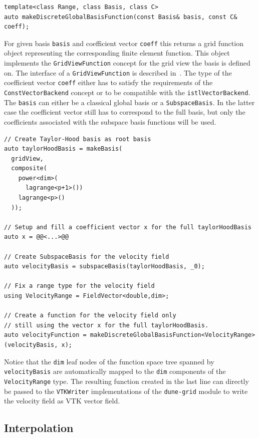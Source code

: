 \documentclass[a4paper,10pt,headings=normal,bibliography=totoc]{scrartcl}
\newcommand{\cpp}[1]{\lstinline[basicstyle=\ttfamily]!#1!}
\newcommand{\dunemodule}[1]{\texttt{#1}}
\begin{document}
\begin{lstlisting}[style=Interface]
template<class Range, class Basis, class C>
auto makeDiscreteGlobalBasisFunction(const Basis& basis, const C& coeff);
\end{lstlisting}

For given basis \cpp{basis} and coefficient vector \cpp{coeff}
this returns a grid function object representing the corresponding
finite element function. This object implements the \cpp{GridViewFunction}
concept for the grid view the basis is defined on. The interface
of a \cpp{GridViewFunction} is described in~\cite{engwer_graeser_muething_sander:2015}.
The type of the coefficient vector \cpp{coeff}
either has to satisfy the requirements of the \cpp{ConstVectorBackend}
concept or to be compatible with the
\cpp{istlVectorBackend}.
The \cpp{basis} can either be a classical global basis or
a \cpp{SubspaceBasis}.  In the latter case the coefficient
vector still has to correspond to the full basis, but only
the coefficients associated with the subspace basis functions
will be used.

\begin{lstlisting}[style=Example]
// Create Taylor-Hood basis as root basis
auto taylorHoodBasis = makeBasis(
  gridView,
  composite(
    power<dim>(
      lagrange<p+1>())
    lagrange<p>()
  ));

// Setup and fill a coefficient vector x for the full taylorHoodBasis
auto x = @@<...>@@

// Create SubspaceBasis for the velocity field
auto velocityBasis = subspaceBasis(taylorHoodBasis, _0);

// Fix a range type for the velocity field
using VelocityRange = FieldVector<double,dim>;

// Create a function for the velocity field only
// still using the vector x for the full taylorHoodBasis.
auto velocityFunction = makeDiscreteGlobalBasisFunction<VelocityRange>(velocityBasis, x);
\end{lstlisting}

Notice that the \cpp{dim} leaf nodes of the function space
tree spanned by \cpp{velocityBasis} are automatically mapped to the
\cpp{dim} components of the \cpp{VelocityRange} type.
The resulting function created in the last line can directly
be passed to the \cpp{VTKWriter} implementations of the
\dunemodule{dune-grid} module to write the velocity field
as VTK vector field.




\subsection{Interpolation}
\end{document}

